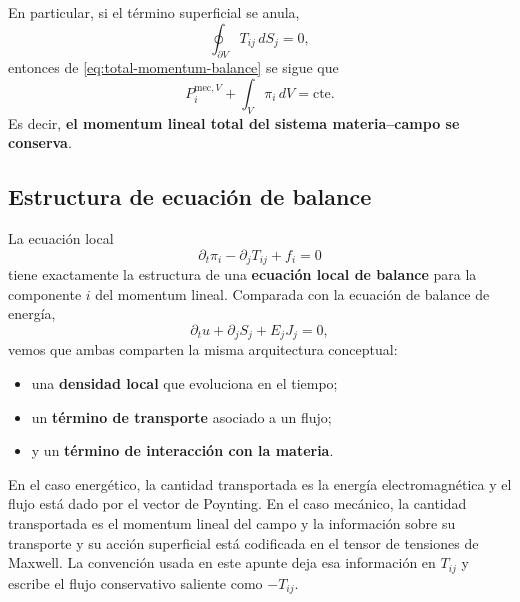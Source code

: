 \documentclass[../main.tex]{subfiles}
\begin{document}
En particular, si el término superficial se anula,
\begin{equation}
    \oint_{\partial V}T_{ij}\,dS_j=0,
    \label{eq:zero-surface-stress}
\end{equation}
entonces de \eqref{eq:total-momentum-balance} se sigue que
\begin{equation}
    P_i^{\mathrm{mec},V}
    +
    \int_V \pi_i\,dV
    =
    \mathrm{cte}.
    \label{eq:momentum-conservation-total}
\end{equation}
Es decir, \textbf{el momentum lineal total del sistema materia--campo se conserva}.

\subsection*{Estructura de ecuación de balance}

La ecuación local
\begin{equation}
    \partial_t\pi_i-\partial_jT_{ij}+f_i=0
    \label{eq:momentum-balance-final}
\end{equation}
tiene exactamente la estructura de una \textbf{ecuación local de balance} para la componente $i$ del momentum lineal. Comparada con la ecuación de balance de energía,
\begin{equation}
    \partial_tu+\partial_jS_j+E_jJ_j=0,
    \label{eq:energy-balance-compact-reminder}
\end{equation}
vemos que ambas comparten la misma arquitectura conceptual:

\begin{itemize}
    \item una \textbf{densidad local} que evoluciona en el tiempo;
    \item un \textbf{término de transporte} asociado a un flujo;
    \item y un \textbf{término de interacción con la materia}.
\end{itemize}

En el caso energético, la cantidad transportada es la energía electromagnética y el flujo está dado por el vector de Poynting. En el caso mecánico, la cantidad transportada es el momentum lineal del campo y la información sobre su transporte y su acción superficial está codificada en el tensor de tensiones de Maxwell. La convención usada en este apunte deja esa información en $T_{ij}$ y escribe el flujo conservativo saliente como $-T_{ij}$.

\newpage
\end{document}
